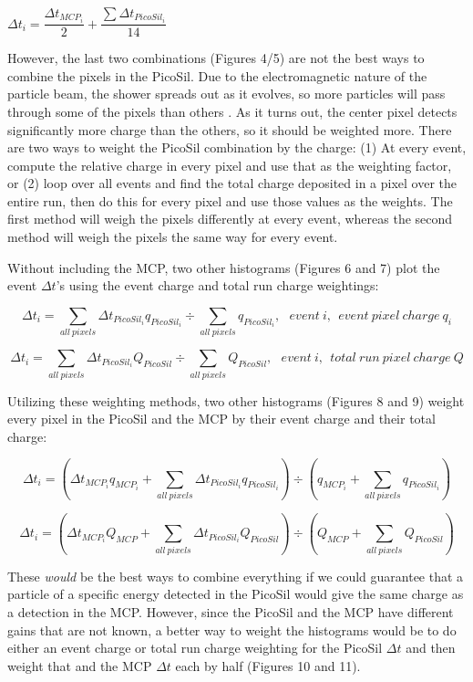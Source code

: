 \documentclass[12pt]{article}
\begin{document}
\centerline{
$\Delta t_i = \dfrac{ \Delta t_{MCP_i} }{2} + \dfrac{\sum \Delta t_{PicoSil_i} }{14} $
}

However, the last two combinations (Figures 4/5) are not the best ways to combine the pixels in the PicoSil. Due to the electromagnetic nature of the particle beam, the shower spreads out as it evolves, so more particles will pass through some of the pixels than others \cite{P2}. As it turns out, the center pixel detects significantly more charge than the others, so it should be weighted more. There are two ways to weight the PicoSil combination by the charge: (1) At every event, compute the relative charge in every pixel and use that as the weighting factor, or (2) loop over all events and find the total charge deposited in a pixel over the entire run, then do this for every pixel and use those values as the weights. The first method will weigh the pixels differently at every event, whereas the second method will weigh the pixels the same way for every event.

Without including the MCP, two other histograms (Figures 6 and 7) plot the event $\Delta t$’s using the event charge and total run charge weightings:

\[
\Delta t_i = \sum_{all\ pixels} \Delta t_{PicoSil_i} q_{PicoSil_i} \div \sum_{all\ pixels} q_{PicoSil_i}
,\ \ \ event\ i
,\ \ event\ pixel\ charge\ q_i
\]

\[
\Delta t_i = \sum_{all\ pixels} \Delta t_{PicoSil_i} Q_{PicoSil} \div \sum_{all\ pixels} Q_{PicoSil}
,\ \ \ event\ i
,\ \ total\ run\ pixel\ charge\ Q
\]

Utilizing these weighting methods, two other histograms (Figures 8 and 9) weight every pixel in the PicoSil and the MCP by their event charge and their total charge:

\[
\Delta t_i = 
\left( \Delta t_{MCP_i} q_{MCP_i} +
\sum_{all\ pixels} \Delta t_{PicoSil_i} q_{PicoSil_i} \right)
\div
\left( q_{MCP_i} +
\sum_{all\ pixels} q_{PicoSil_i} \right)
\]

\[
\Delta t_i = 
\left( \Delta t_{MCP_i} Q_{MCP} +
\sum_{all\ pixels} \Delta t_{PicoSil_i} Q_{PicoSil} \right)
\div
\left( Q_{MCP} +
\sum_{all\ pixels} Q_{PicoSil} \right)
\]

These \textit{would} be the best ways to combine everything if we could guarantee that a particle of a specific energy detected in the PicoSil would give the same charge as a detection in the MCP. However, since the PicoSil and the MCP have different gains that are not known, a better way to weight the histograms would be to do either an event charge or total run charge weighting for the PicoSil $\Delta t$ and then weight that and the MCP $\Delta t$ each by half (Figures 10 and 11).
\end{document}
